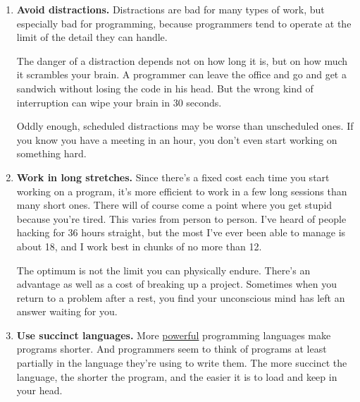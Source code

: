 \begin{enumerate}
\def\labelenumi{\arabic{enumi}.}
\item
  \textbf{Avoid distractions.} Distractions are bad for many types of
  work, but especially bad for programming, because programmers tend to
  operate at the limit of the detail they can handle.

  The danger of a distraction depends not on how long it is, but on how
  much it scrambles your brain. A programmer can leave the office and go
  and get a sandwich without losing the code in his head. But the wrong
  kind of interruption can wipe your brain in 30 seconds.

  Oddly enough, scheduled distractions may be worse than unscheduled
  ones. If you know you have a meeting in an hour, you don't even start
  working on something hard.
\item
  \textbf{Work in long stretches.} Since there's a fixed cost each time
  you start working on a program, it's more efficient to work in a few
  long sessions than many short ones. There will of course come a point
  where you get stupid because you're tired. This varies from person to
  person. I've heard of people hacking for 36 hours straight, but the
  most I've ever been able to manage is about 18, and I work best in
  chunks of no more than 12.

  The optimum is not the limit you can physically endure. There's an
  advantage as well as a cost of breaking up a project. Sometimes when
  you return to a problem after a rest, you find your unconscious mind
  has left an answer waiting for you.
\item
  \textbf{Use succinct languages.} More \href{power.html}{powerful}
  programming languages make programs shorter. And programmers seem to
  think of programs at least partially in the language they're using to
  write them. The more succinct the language, the shorter the program,
  and the easier it is to load and keep in your head.


\end{enumerate}

